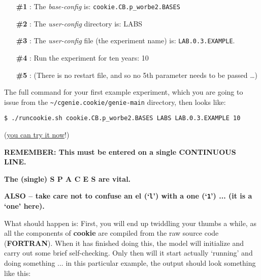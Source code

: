 \vspace{2mm}
\begin{enumerate}[noitemsep]
\setlength{\itemindent}{.2in}
\item[\textbf{\#1}]: The \textit{base-config} is: \texttt{cookie.CB.p\_worbe2.BASES}
\item[\textbf{\#2}]: The \textit{user-config} directory is: \textsf{\small LABS}
\item[\textbf{\#3}]: The \textit{user-config} file (the experiment name) is: \texttt{LAB.0.3.EXAMPLE}.
\item[\textbf{\#4}]: Run the experiment for ten years: 10
\item[\textbf{\#5}]: (There is no restart file, and so no 5th parameter needs to be passed …)
\end{enumerate}

The full command for your first example experiment, which you are going to issue from the \texttt{\~}\texttt{/cgenie.cookie/genie-main} directory, then looks like:

\vspace{-1mm}\begin{verbatim}
$ ./runcookie.sh cookie.CB.p_worbe2.BASES LABS LAB.0.3.EXAMPLE 10
\end{verbatim}\vspace{-1mm}

\noindent(\uline{you can try it now}!)

\vspace{2mm}
\textbf{REMEMBER: This must be entered on a single CONTINUOUS LINE.}

\textbf{The (single) S P A C E S are vital. }

\textbf{ALSO -- take care not to confuse an el (‘\texttt{l}’) with a one (‘\texttt{1}’)  ... (it is a ‘one’ here).}

\newpage

\noindent What should happen is: First, you will end up twiddling your thumbs a while, as all the components of \textbf{cookie} are compiled from the raw source code (\textbf{FORTRAN}). When it has finished doing this, the model will initialize and carry out some brief self-checking. Only then will it start actually ‘running’ and doing something ... in this particular example, the output should look something like this:

